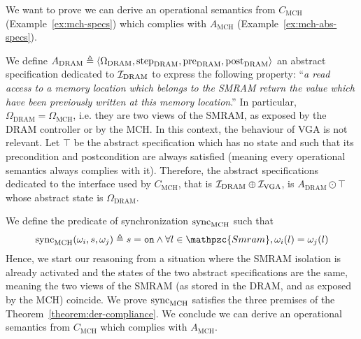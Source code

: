 \begin{example}
  We want to prove we can derive an operational semantics from
  $C_{\mathrm{MCH}}$ (Example~\ref{ex:mch-specs}) which complies with
  $A_{\mathrm{MCH}}$ (Example~\ref{ex:mch-abs-specs}).

  We define
  $A_{\mathrm{DRAM}} \triangleq \langle \Omega_{\mathrm{DRAM}},
  \mathrm{step}_{\mathrm{DRAM}}, \mathrm{pre}_{\mathrm{DRAM}},
  \mathrm{post}_{\mathrm{DRAM}} \rangle$ an abstract specification dedicated to
  $\mathcal{I}_{\mathrm{DRAM}}$ to express the following property: ``\emph{a read access
    to a memory location which belongs to the SMRAM return the value which have
    been previously written at this memory location}.'' In particular,
  $\Omega_{\mathrm{DRAM}} = \Omega_{\mathrm{MCH}}$, i.e. they are two views of
  the SMRAM, as exposed by the DRAM controller or by the MCH.
  In this context, the behaviour of VGA is not relevant. Let $\top$ be the
  abstract specification which has no state and such that its precondition and
  postcondition are always satisfied (meaning every operational semantics always
  complies with it).
  Therefore, the abstract specifications dedicated to the interface used by
  $C_{\mathrm{MCH}}$, that is $\mathcal{I}_{\mathrm{DRAM}} \oplus \mathcal{I}_{\mathrm{VGA}}$, is
  $A_{\mathrm{DRAM}} \odot \top$ whose abstract state is
  $\Omega_{\mathrm{DRAM}}$.

  We define the predicate of synchronization $\mathrm{sync}_{\mathrm{MCH}}$ such
  that
  \[ \func{sync}_{\mathrm{MCH}}(\omega_i, s, \omega_j) \triangleq s = \val{on}
    \wedge \forall l \in \mathpzc{Smram}, \omega_i(l) = \omega_j(l)
  \] Hence, we start our reasoning from a situation where the SMRAM isolation is
  already activated and the states of the two abstract specifications are the
  same, meaning the two views of the SMRAM (as stored in the DRAM, and as
  exposed by the MCH) coincide.
  We prove $\mathrm{sync}_{\mathrm{MCH}}$ satisfies the three premises of the
  Theorem~\ref{theorem:der-compliance}. We conclude we can derive an operational
  semantics from $C_{\mathrm{MCH}}$ which complies with $A_{\mathrm{MCH}}$.
\end{example}

